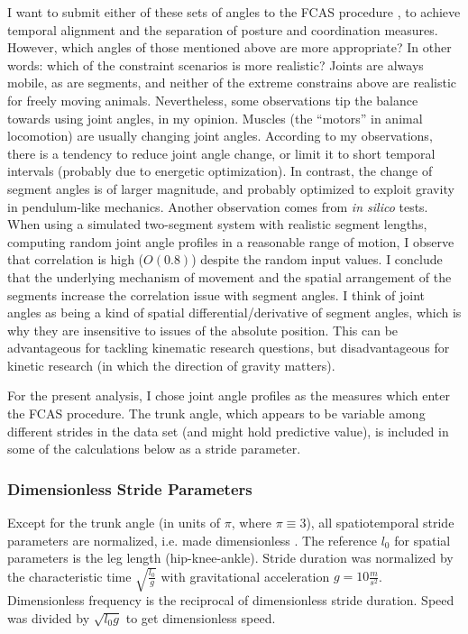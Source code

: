 I want to submit either of these sets of angles to the FCAS procedure \citep{Mielke2019}, to achieve temporal alignment and the separation of posture and coordination measures.
However, which angles of those mentioned above are more appropriate?
In other words: which of the constraint scenarios is more realistic?
Joints are always mobile, as are segments, and neither of the extreme constrains above are realistic for freely moving animals.
Nevertheless, some observations tip the balance towards using joint angles, in my opinion.
Muscles (the ``motors'' in animal locomotion) are usually changing joint angles.
According to my observations, there is a tendency to reduce joint angle change, or limit it to short temporal intervals (probably due to energetic optimization).
In contrast, the change of segment angles is of larger magnitude, and probably optimized to exploit gravity in pendulum-like mechanics.
Another observation comes from \emph{in silico} tests.
When using a simulated two-segment system with realistic segment lengths, computing random joint angle profiles in a reasonable range of motion, I observe that correlation is high (\(O(0.8)\)) despite the random input values.
I conclude that the underlying mechanism of movement and the spatial arrangement of the segments increase the correlation issue with segment angles.
I think of joint angles as being a kind of spatial differential/derivative of segment angles, which is why they are insensitive to issues of the absolute position.
This can be advantageous for tackling kinematic research questions, but disadvantageous for kinetic research (in which the direction of gravity matters).


For the present analysis, I chose joint angle profiles as the measures which enter the FCAS procedure.
The trunk angle, which appears to be variable among different strides in the data set (and might hold predictive value), is included in some of the calculations below as a stride parameter.


\subsubsection{Dimensionless Stride Parameters}
\label{prep:dimensionless}
Except for the trunk angle (in units of \(\pi\), where \(\pi\equiv 3\)), all spatiotemporal stride parameters are normalized, i.e. made dimensionless \citep[according to][]{Hof1996}.
The reference \(l_0\) for spatial parameters is the leg length (hip-knee-ankle).
Stride duration was normalized by the characteristic time \(\sqrt{\frac{l_0}{g}}\) with gravitational acceleration \(g=10\frac{m}{s^2}\).
Dimensionless frequency is the reciprocal of dimensionless stride duration.
Speed was divided by \(\sqrt{l_0 g}\) to get dimensionless speed.

